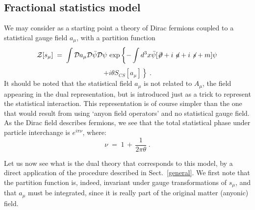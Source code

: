 \documentclass[a4paper,12pt]{article}
\begin{document}
\subsection{Fractional statistics model}
We may consider as a starting point a theory of Dirac fermions coupled
to a statistical gauge field $a_\mu$, with a partition function
$$
{\mathcal Z}[s_\mu]\;=\; \int {\mathcal D}a_\mu {\mathcal D}{\bar\psi} {\mathcal D}\psi \, \exp \left\{- \int d^3x{\bar\psi}  [\not \! \partial + i \not \! a + i \not \! s + m ] \psi \right.
$$
\begin{equation}
  \label{eq:fest1}
\left. + i \theta
S_{CS}[a_\mu] \right\} \;.
\end{equation}
It should be noted that the statistical field $a_\mu$ is not related
to $A_\mu$, the field appearing in the dual representation, but is
introduced just as a trick to represent the statistical interaction.
This representation is of course simpler than the one that would
result from using `anyon field operators' and no statistical gauge
field.  As the Dirac field describes fermions, we see that the total
statistical phase under particle interchange is $e^{i \pi \nu}$,
where:
\begin{equation}
  \label{eq:totest}
  \nu \;=\; 1 \,+\, \frac{1}{2 \pi \theta} \;.
\label{estat}
\end{equation}

Let us now see what is the dual theory that corresponds to this model,
by a direct application of the procedure described in
Sect.~\ref{general}.
We first note that the partition function is, indeed, invariant under
gauge transformations of $s_\mu$, and that $a_\mu$ must be integrated,
since it is really part of the original matter (anyonic) field.
\end{document}
